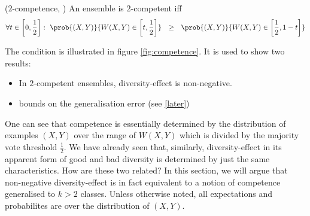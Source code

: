 \documentclass[../main.tex]{subfiles}
\begin{document}
\begin{definition} ($2$-competence, \cite{theisen}) An ensemble is $2$-competent iff
$$
\forall t \in \left[ 0, \frac{1}{2} \right]: ~ \prob{(X,Y) }{W(X,Y)  \in \left[ t, \frac{1}{2} \right]} ~ ~  \geq ~ ~ \prob{(X,Y) }{W(X,Y) \in \left[ \frac{1}{2}, 1-t \right]}
$$
\end{definition}
The condition is illustrated in figure \ref{fig:competence}.  
It is used to show two results:
\begin{itemize}
	\item In $2$-competent ensembles, diversity-effect is non-negative.
	\item bounds on the generalisation error (see \ref{later}) %
\end{itemize}

One can see that competence is essentially determined by the distribution of examples $(X,Y)$ over the range of $W(X,Y)$ which is divided by the majority vote threshold $\frac{1}{2}$. We have already seen that, similarly, diversity-effect in its apparent form of good and bad diversity is determined by just the same characteristics. How are these two related?
In this section, we will argue that non-negative diversity-effect is in fact equivalent to a notion of competence generalised to $k > 2$ classes. Unless otherwise noted, all expectations and probabilites are over the distribution of $(X,Y)$.
\end{document}

